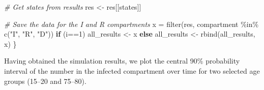 \documentclass[
]{article}
\newenvironment{Shaded}{\begin{snugshade}}{\end{snugshade}}
\newcommand{\CommentTok}[1]{\textcolor[rgb]{0.56,0.35,0.01}{\textit{#1}}}
\newcommand{\ControlFlowTok}[1]{\textcolor[rgb]{0.13,0.29,0.53}{\textbf{#1}}}
\newcommand{\DecValTok}[1]{\textcolor[rgb]{0.00,0.00,0.81}{#1}}
\newcommand{\FunctionTok}[1]{\textcolor[rgb]{0.00,0.00,0.00}{#1}}
\newcommand{\NormalTok}[1]{#1}
\newcommand{\OtherTok}[1]{\textcolor[rgb]{0.56,0.35,0.01}{#1}}
\newcommand{\SpecialCharTok}[1]{\textcolor[rgb]{0.00,0.00,0.00}{#1}}
\newcommand{\StringTok}[1]{\textcolor[rgb]{0.31,0.60,0.02}{#1}}
\begin{document}
\begin{Shaded}
\begin{Highlighting}[]
  \CommentTok{\# Get states from results}
\NormalTok{  res }\OtherTok{\textless{}{-}}\NormalTok{ res[[}\StringTok{\textquotesingle{}states\textquotesingle{}}\NormalTok{]]}

  \CommentTok{\# Save the data for the I and R compartments}
\NormalTok{  x }\OtherTok{=} \FunctionTok{filter}\NormalTok{(res, compartment }\SpecialCharTok{\%in\%} \FunctionTok{c}\NormalTok{(}\StringTok{"I"}\NormalTok{, }\StringTok{"R"}\NormalTok{, }\StringTok{"D"}\NormalTok{))}
  \ControlFlowTok{if}\NormalTok{ (i}\SpecialCharTok{==}\DecValTok{1}\NormalTok{)}
\NormalTok{    all\_results }\OtherTok{\textless{}{-}}\NormalTok{ x}
  \ControlFlowTok{else}
\NormalTok{    all\_results }\OtherTok{\textless{}{-}} \FunctionTok{rbind}\NormalTok{(all\_results, x)}
\NormalTok{\}}
\end{Highlighting}
\end{Shaded}

Having obtained the simulation results, we plot the central 90\%
probability interval of the number in the infected compartment over time
for two selected age groups (15--20 and 75--80).
\end{document}
